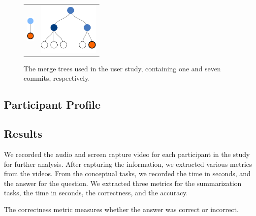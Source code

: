 \begin{figure}[bpt]
  \centering
\begin{tabular}{ m{1.5cm} m{3cm} }
  \includegraphics[height=0.5in]{figures/commits/1-commit.pdf} &
  \includegraphics[height=1in]{figures/commits/7-commits.pdf}\\
\end{tabular}
  \caption{The merge trees used in the user study,
    containing one and seven commits, respectively.}
  \label{fig:study_commits}
\end{figure}



\subsection{Participant Profile}
\label{sub:participant_profile}


\subsection{Results}
\label{sec:results}

We recorded the audio and screen capture video for each participant in
the study for further analysis.
After capturing the information, we
extracted various metrics from the videos.
From the conceptual tasks, we
recorded the time in seconds, and the answer for the question. We
extracted three metrics for the summarization tasks, the time in
seconds, the correctness, and the accuracy.

The correctness metric measures whether the answer was correct or
incorrect.

